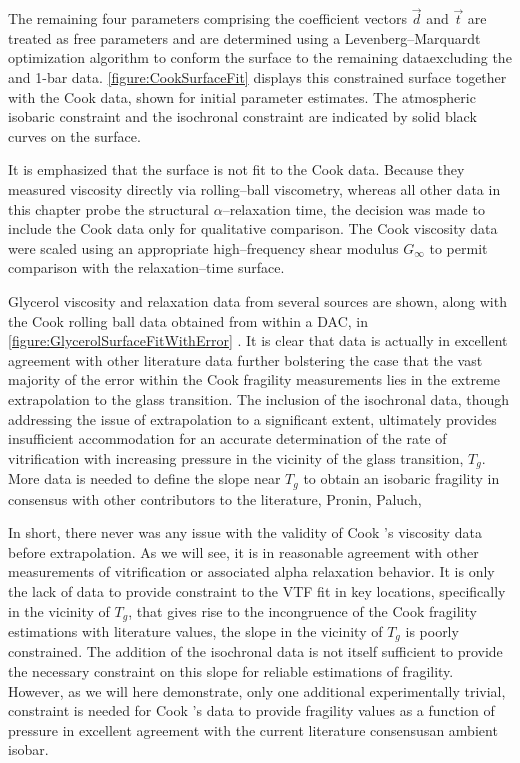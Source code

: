 	The remaining four parameters comprising the coefficient vectors $\vec{d}$ and $\vec{t}$ are treated as free parameters and are determined using a Levenberg--Marquardt optimization algorithm to conform the surface to the remaining data\textemdash excluding the \tgp and 1-bar data. \fig \ref{figure:CookSurfaceFit} displays this constrained surface together with the Cook \etal data, shown for initial parameter estimates. The atmospheric isobaric constraint and the isochronal \tgp constraint are indicated by solid black curves on the surface.
	
	It is emphasized that the surface is not fit to the Cook \etal data. Because they measured viscosity directly via rolling--ball viscometry, whereas all other data in this chapter probe the structural $\alpha$--relaxation time, the decision was made to include the Cook \etal data only for qualitative comparison.  The Cook \etal viscosity data were scaled using an appropriate high--frequency shear modulus $G_\infty$ to permit comparison with the relaxation--time surface.
	
	Glycerol viscosity and relaxation data from several sources are shown, along with the Cook \etal rolling ball data obtained from within a DAC, in \fig \nolinebreak \ref{figure:GlycerolSurfaceFitWithError} \nolinebreak\cite{Brodin,McDuffie,Paluch,Pronin,Reiser}.  It is clear that data is actually in excellent agreement with other literature data further bolstering the case that the vast majority of the error within the Cook \etal fragility measurements lies in the extreme extrapolation to the glass transition.  The inclusion of the \tgp isochronal data, though addressing the issue of extrapolation to a significant extent, ultimately provides insufficient accommodation for an accurate determination of the rate of vitrification with increasing pressure in the vicinity of the glass transition, $T_g$.  More data is needed to define the slope near $T_g$ to obtain an isobaric fragility in consensus with other contributors to the literature, \ie Pronin, Paluch, \etc  
	
	In short, there never was any issue with the validity of Cook \etal's viscosity data before extrapolation.  As we will see, it is in reasonable agreement with other measurements of vitrification or associated alpha relaxation behavior.  It is only the lack of data to provide constraint to the VTF fit in key locations, specifically in the vicinity of $T_g$, that gives rise to the incongruence of the Cook \etal fragility estimations with literature values, \ie the slope in the vicinity of $T_g$ is poorly constrained.  The addition of the \tgp isochronal data is not itself sufficient to provide the necessary constraint on this slope for reliable estimations of fragility.  However, as we will here demonstrate, only one additional experimentally trivial, constraint is needed for Cook \etal's data to provide fragility values as a function of pressure in excellent agreement with the current literature consensus\textemdash an ambient isobar.  
	
